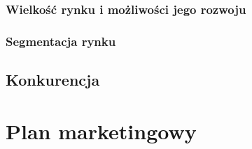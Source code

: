 \documentclass[12pt]{article}
\begin{document}
\subsubsection{Wielkość rynku i możliwości jego rozwoju}


\subsubsection{Segmentacja rynku}


\subsection{Konkurencja}


\section{Plan marketingowy}


\end{document}
